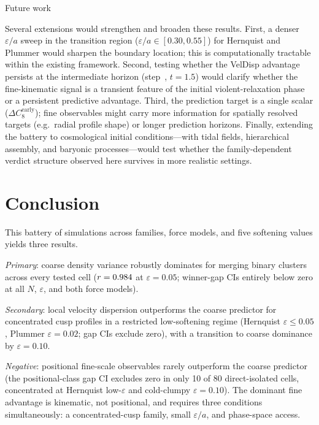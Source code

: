 \documentclass[twocolumn,linenumbers]{aastex701}
\makeatletter
\def\subsection{\@startsection{subsection}{2}{\z@}{9pt plus 1pt minus 1pt}{4pt}%
  {\normalsize\bfseries\center}}
\newcommand{\dCearly}{\Delta C_{8}^{\mathrm{early}}}
\newcommand{\heps}{\varepsilon}
\makeatother
\begin{document}
\subsection{Future work}

Several extensions would strengthen and broaden these results.
First, a denser $\heps/a$ sweep in the transition region
($\heps/a \in [0.30, 0.55]$) for Hernquist and Plummer would sharpen
the boundary location; this is computationally tractable within the
existing framework.
Second, testing whether the VelDisp advantage persists at the
intermediate horizon (step~\HMid{}, $t = 1.5$) would clarify whether
the fine-kinematic signal is a transient feature of the initial
violent-relaxation phase or a persistent predictive advantage.
Third, the prediction target is a single scalar ($\dCearly$); fine
observables might carry more information for spatially resolved targets
(e.g.\ radial profile shape) or longer prediction horizons.
Finally, extending the battery to cosmological initial conditions---with
tidal fields, hierarchical assembly, and baryonic processes---would test
whether the family-dependent verdict structure observed here survives in
more realistic settings.


\section{Conclusion}
\label{sec:conclusion}

This battery of \TotalRuns{} simulations across \NICs{} families,
\NModels{} force models, and five softening values yields three results.

\textit{Primary}: coarse density variance robustly dominates for
merging binary clusters across every tested cell ($r = 0.984{}$
at $\heps = 0.05$; winner-gap CIs entirely below zero at all $N$,
$\heps$, and both force models).

\textit{Secondary}: local velocity dispersion outperforms the coarse
predictor for concentrated cusp profiles in a restricted low-softening
regime (Hernquist $\heps \le 0.05$, Plummer $\heps = 0.02$; gap CIs
exclude zero), with a transition to coarse dominance by $\heps = 0.10$.

\textit{Negative}: positional fine-scale observables rarely outperform
the coarse predictor (the positional-class gap CI excludes zero in only
10 of 80 direct-isolated cells, concentrated at Hernquist low-$\heps$
and cold-clumpy $\heps = 0.10$).
The dominant fine advantage is kinematic, not positional, and requires
three conditions simultaneously: a concentrated-cusp family, small
$\heps/a$, and phase-space access.
\end{document}

